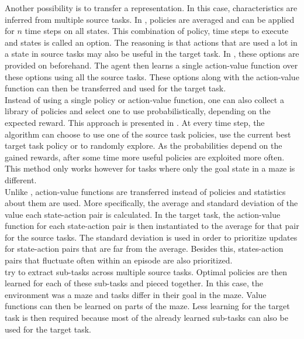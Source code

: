 Another possibility is to transfer a representation. In this case, characteristics are inferred from multiple source tasks.
In \cite{Bernstein99reusingold}, policies are averaged and can be applied for $n$ time steps on all states. This combination of policy, time steps to execute and states is called an option. The reasoning is that actions that are used a lot in a state in source tasks may also be useful in the target task. In \cite{perkins1999using}, these options are provided on beforehand. The agent then learns a single action-value function over these options using all the source tasks. These options along with the action-value function can then be transferred and used for the target task.\\

Instead of using a single policy or action-value function, one can also collect a library of policies and select one to use probabilistically, depending on the expected reward. This approach is presented in \cite{fernandez2006probabilistic,fernandez2013learning}. At every time step, the algorithm can choose to use one of the source task policies, use the current best target task policy or to randomly explore. As the probabilities depend on the gained rewards, after some time more useful policies are exploited more often. This method only works however for tasks where only the goal state in a maze is different.\\

Unlike \cite{conf/cira/TanakaY03}, action-value functions are transferred instead of policies and statistics about them are used. More specifically, the average and standard deviation of the value each state-action pair is calculated. In the target task, the action-value function for each state-action pair is then instantiated to the average for that pair for the source tasks. The standard deviation is used in order to prioritize updates for state-action pairs that are far from the average. Besides this, states-action pairs that fluctuate often within an episode are also prioritized.\\

\cite{journals/ml/FosterD02} try to extract sub-tasks across multiple source tasks. Optimal policies are then learned for each of these sub-tasks and pieced together. In this case, the environment was a maze and tasks differ in their goal in the maze. Value functions can then be learned on parts of the maze. Less learning for the target task is then required because most of the already learned sub-tasks can also be used for the target task.\\

